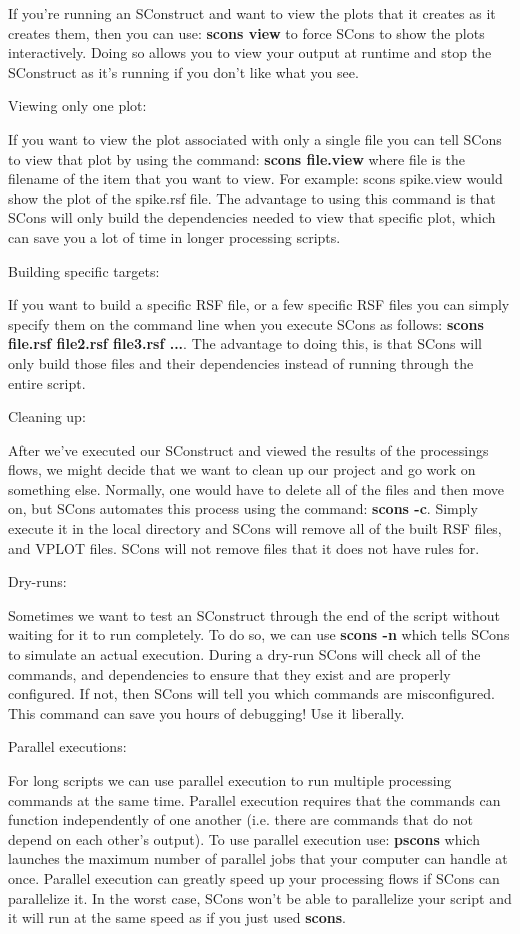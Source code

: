 If you're running an SConstruct and want to view the plots that it creates as it creates them, then you can use: \textbf{scons view} to force SCons to show the plots interactively.  Doing so allows you to view your output at runtime and stop the SConstruct as it's running if you don't like what you see.

Viewing only one plot:

If you want to view the plot associated with only a single file you can tell SCons to view that plot by using the command: \textbf{scons file.view} where file is the filename of the item that you want to view.  For example: scons spike.view would show the plot of the spike.rsf file.  The advantage to using this command is that SCons will only build the dependencies needed to view that specific plot, which can save you a lot of time in longer processing scripts.

Building specific targets:

If you want to build a specific RSF file, or a few specific RSF files you can simply specify them on the command line when you execute SCons as follows: \textbf{scons file.rsf file2.rsf file3.rsf ...}.  The advantage to doing this, is that SCons will only build those files and their dependencies instead of running through the entire script.

Cleaning up: 

After we've executed our SConstruct and viewed the results of the processings flows, we might decide that we want to clean up our project and go work on something else.  Normally, one would have to delete all of the files and then move on, but SCons automates this process using the command: \textbf{scons -c}.  Simply execute it in the local directory and SCons will remove all of the built RSF files, and VPLOT files.  SCons will not remove files that it does not have rules for.

Dry-runs:

Sometimes we want to test an SConstruct through the end of the script without waiting for it to run completely.  To do so, we can use \textbf{scons -n} which tells SCons to simulate an actual execution. During a dry-run SCons will check all of the commands, and dependencies to ensure that they exist and are properly configured.  If not, then SCons will tell you which commands are misconfigured.  This command can save you hours of debugging!  Use it liberally.

Parallel executions:

For long scripts we can use parallel execution to run multiple processing commands at the same time.  Parallel execution requires that the commands can function independently of one another (i.e. there are commands that do not depend on each other's output).  To use parallel execution use: \textbf{pscons} which launches the maximum number of parallel jobs that your computer can handle at once.  Parallel execution can greatly speed up your processing flows if SCons can parallelize it.  In the worst case, SCons won't be able to parallelize your script and it will run at the same speed as if you just used \textbf{scons}.

